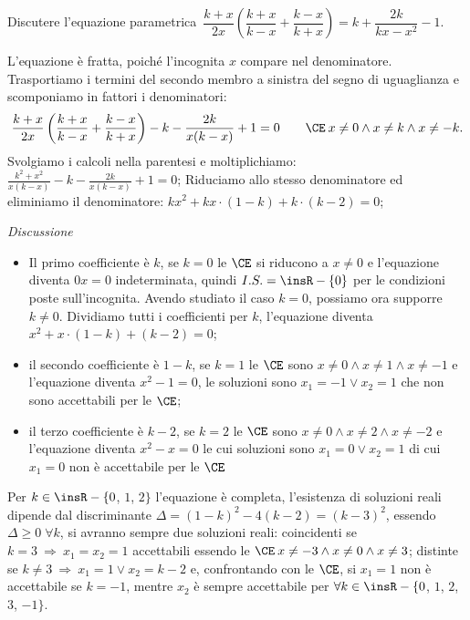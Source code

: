 \begin{exrig}
\begin{esempio}
Discutere l'equazione parametrica~$\dfrac{k + x}{2 x} \left( \dfrac{k + x}{k - x} + \dfrac{k - x}{k + x} \right)=k + \dfrac{2 k}{k x - x^{2}} - 1$.

L'equazione è fratta, poiché l'incognita $x$ compare nel denominatore. Trasportiamo i termini del secondo membro a sinistra del segno di uguaglianza e scomponiamo in fattori i denominatori: 
\[\frac{k + x}{2 x} \left( \frac{k + x}{k - x} + \frac{k - x}{k +x} \right) - k - \frac{2 k}{x ( k - x )} + 1=0\qquad \CE\: x \neq 0 \wedge x \neq k \wedge x \neq - k.\]
Svolgiamo i calcoli nella parentesi e moltiplichiamo: $\frac{k^{2} + x^{2}}{x ( k - x )} - k - \frac{2 k}{x ( k - x )} + 1=0$;
Riduciamo allo stesso denominatore ed eliminiamo il denominatore: $k x^{2} + k x \cdot ( 1 - k ) + k \cdot ( k - 2 )=0$;

\emph{Discussione}
\begin{itemize}
 \item Il primo coefficiente è $k$, se $k = 0$ le $\CE$ si riducono a $x \neq 0$ e l'equazione diventa $0x = 0$ indeterminata, quindi $I.S. = \insR - \{ 0\}$ per le condizioni poste sull'incognita. Avendo studiato il caso $k=0$, possiamo ora supporre $k \neq 0$. Dividiamo tutti i coefficienti per $k$, l'equazione diventa $x^{2} + x \cdot ( 1 - k ) + ( k - 2 )=0$;
 \item il secondo coefficiente è $1-k$, se $k = 1$ le $\CE$ sono $x \neq 0 \wedge x \neq 1 \wedge x \neq - 1$ e l'equazione diventa $x^{2} - 1 = 0$, le soluzioni sono $x_{1} = -1 \vee x_{2} = 1$ che non sono accettabili per le $\CE$;
 \item il terzo coefficiente è $k-2$, se $k = 2$ le $\CE$ sono $x \neq 0 \wedge x \neq 2 \wedge x \neq - 2$ e l'equazione diventa $x^{2} - x = 0$ le cui soluzioni sono $x_{1} = 0 \vee x_{2} = 1$ di cui $x_{1} = 0$ non è accettabile per le $\CE$
\end{itemize}
Per $k \in \insR - \{0$, $1$, $2\}$ l'equazione è completa, l'esistenza di soluzioni reali dipende dal discriminante $\Delta = (1 - k)^{2}-4(k-2)=(k-3)^{2}$, essendo
$\Delta \geq 0\; \forall k$, si avranno sempre due soluzioni reali: coincidenti se $k = 3 \:\Rightarrow\: x_{1} = x_{2} = 1$ accettabili essendo le
$\CE\: x \neq - 3 \wedge x \neq 0 \wedge x \neq 3$; distinte se $k \neq 3 \:\Rightarrow\: x_{1} = 1 \vee x_{2} = k - 2$ e, confrontando con le $\CE$, si $x_{1} = 1$
non è accettabile se $k = - 1$, mentre $x_{2}$ è sempre accettabile per $\forall k \in \insR - \{0$, $1$, $2$, $3$, $-1\}$.


\end{esempio}
\end{exrig}
